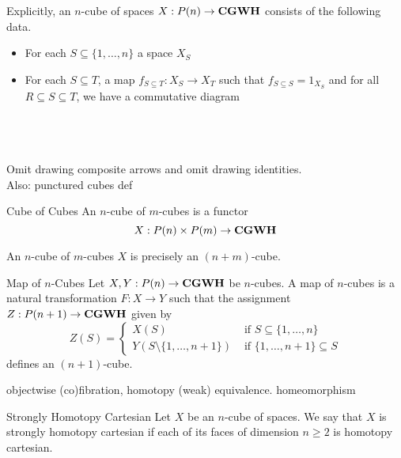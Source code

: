 \documentclass[a4paper]{article}
\begin{document}
Explicitly, an $n$-cube of spaces $X:P(n)\to\bold{CGWH}$ consists of the following data. 
\begin{itemize}
\item For each $S\subseteq\{1,\dots,n\}$ a space $X_S$
\item For each $S\subseteq T$, a map $f_{S\subseteq T}:X_S\to X_T$ such that $f_{S\subseteq S}=1_{X_S}$ and for all $R\subseteq S\subseteq T$, we have a commutative diagram \\~\\
\\~\\
\end{itemize}

Omit drawing composite arrows and omit drawing identities. \\
Also: punctured cubes def

\begin{defn}{Cube of Cubes}{} An $n$-cube of $m$-cubes is a functor $$X:P(n)\times P(m)\to\bold{CGWH}$$
\end{defn}

\begin{lmm}{}{} An $n$-cube of $m$-cubes $X$ is precisely an $(n+m)$-cube. 
\end{lmm}

\begin{defn}{Map of $n$-Cubes}{} Let $X,Y:P(n)\to\bold{CGWH}$ be $n$-cubes. A map of $n$-cubes is a natural transformation $F:X\to Y$ such that the assignment $Z:P(n+1)\to\bold{CGWH}$ given by $$Z(S)=\begin{cases}
X(S) & \text{ if } S\subseteq\{1,\dots,n\}\\
Y(S\setminus\{1,\dots, n+1\}) & \text{ if }\{1,\dots,n+1\}\subseteq S
\end{cases}$$
defines an $(n+1)$-cube. 
\end{defn}

objectwise (co)fibration, homotopy (weak) equivalence. homeomorphism

\begin{defn}{Strongly Homotopy Cartesian}{} Let $X$ be an $n$-cube of spaces. We say that $X$ is strongly homotopy cartesian if each of its faces of dimension $n\geq 2$ is homotopy cartesian. 
\end{defn}
\end{document}
